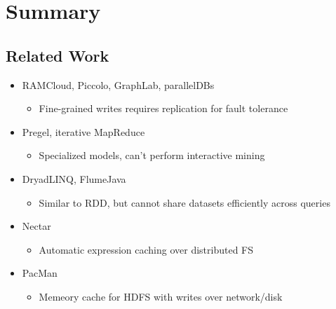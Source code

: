 \section*{Summary}
\subsection{Related Work}
\begin{frame}
  \begin{itemize}
    \item RAMCloud, Piccolo, GraphLab, parallelDBs
    	\begin{itemize}
    	  \item Fine-grained writes requires replication for fault tolerance
    	\end{itemize}
    \item Pregel, iterative MapReduce
    	\begin{itemize}
    	  \item Specialized models, can't perform interactive mining
    	\end{itemize}
    \item DryadLINQ, FlumeJava
    	\begin{itemize}
    	  \item Similar to RDD, but cannot share datasets efficiently across
    	  queries
    	\end{itemize}
    \item Nectar
    	\begin{itemize}
    	  \item Automatic expression caching over distributed FS
    	\end{itemize}
    \item PacMan
    	\begin{itemize}
    	  \item Memeory cache for HDFS with writes over network/disk
    	\end{itemize}
  \end{itemize}
\end{frame}

